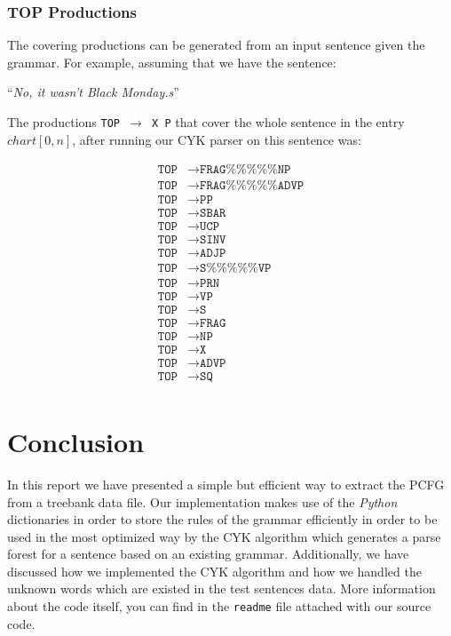\documentclass[a4paper,11pt]{article}
\begin{document}
\subsubsection{TOP Productions}
The covering productions can be generated from an input sentence given
the grammar. For example, assuming that we have the sentence:
\begin{center}
``\textit{No, it wasn't Black Monday.s}''
\end{center}
The productions \texttt{TOP $\rightarrow$ X P} that cover the whole sentence in the  entry $chart[0, n]$, after running our CYK parser on this sentence was:
\begin{scriptsize}
\begin{align*}
\texttt{TOP} &\rightarrow \texttt{FRAG\%\%\%\%\%NP} \\
\texttt{TOP} &\rightarrow  \texttt{FRAG\%\%\%\%\%ADVP} \\
\texttt{TOP} &\rightarrow  \texttt{PP} \\
\texttt{TOP} &\rightarrow  \texttt{SBAR} \\
\texttt{TOP}  &\rightarrow \texttt{UCP} \\
\texttt{TOP}  &\rightarrow \texttt{SINV} \\
\texttt{TOP} &\rightarrow  \texttt{ADJP} \\
\texttt{TOP}  &\rightarrow \texttt{S\%\%\%\%\%VP} \\
\texttt{TOP} &\rightarrow  \texttt{PRN} \\
\texttt{TOP}  &\rightarrow \texttt{VP} \\
\texttt{TOP} &\rightarrow  \texttt{S} \\
\texttt{TOP} &\rightarrow  \texttt{FRAG} \\
\texttt{TOP} &\rightarrow  \texttt{NP} \\
\texttt{TOP}  &\rightarrow \texttt{X} \\
\texttt{TOP}  &\rightarrow \texttt{ADVP} \\
\texttt{TOP} &\rightarrow  \texttt{SQ} \\
\end{align*}

\end{scriptsize}

\section{Conclusion}
\label{concl}
In this report we have presented a simple but efficient way to extract the PCFG from a
treebank data file. Our implementation makes use of the \textit{Python} dictionaries in order to store the rules of the grammar efficiently in order to be used in the most optimized way by the CYK algorithm which generates a parse forest for a sentence based on an existing grammar.
 Additionally, we have discussed how we implemented the CYK algorithm and how we handled the unknown words which are existed in the test sentences data. More information about the code itself, you can find in the \texttt{readme} file attached with our source code.
\end{document}
